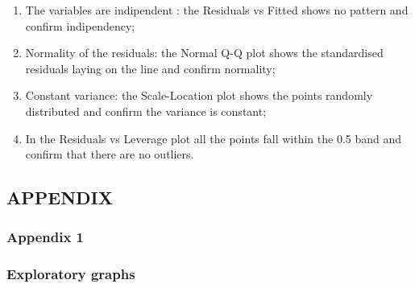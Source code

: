 \documentclass[]{article}
\begin{document}
\begin{enumerate}
\def\labelenumi{\arabic{enumi}.}
\itemsep1pt\parskip0pt
\item
  The variables are indipendent : the Residuals vs Fitted shows no
  pattern and confirm indipendency;
\item
  Normality of the residuals: the Normal Q-Q plot shows the standardised
  residuals laying on the line and confirm normality;
\item
  Constant variance: the Scale-Location plot shows the points randomly
  distributed and confirm the variance is constant;
\item
  In the Residuals vs Leverage plot all the points fall within the 0.5
  band and confirm that there are no outliers.
\end{enumerate}

\subsection{APPENDIX}\label{appendix}

\subsubsection{Appendix 1}\label{appendix-1}

\subsubsection{Exploratory graphs}\label{exploratory-graphs}
\end{document}
